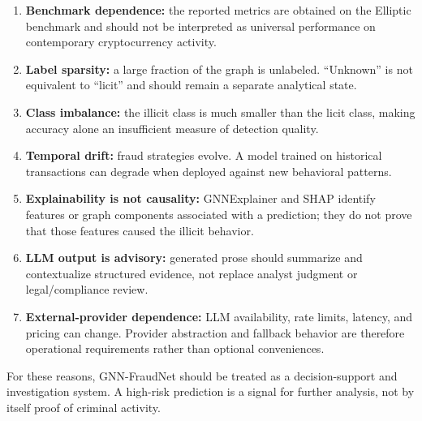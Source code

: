 \documentclass[11pt,a4paper]{report}
\begin{document}
\begin{enumerate}[leftmargin=1.5em]
  \item \textbf{Benchmark dependence:} the reported metrics are obtained on the Elliptic benchmark and should not be interpreted as universal performance on contemporary cryptocurrency activity.
  \item \textbf{Label sparsity:} a large fraction of the graph is unlabeled. ``Unknown'' is not equivalent to ``licit'' and should remain a separate analytical state.
  \item \textbf{Class imbalance:} the illicit class is much smaller than the licit class, making accuracy alone an insufficient measure of detection quality.
  \item \textbf{Temporal drift:} fraud strategies evolve. A model trained on historical transactions can degrade when deployed against new behavioral patterns.
  \item \textbf{Explainability is not causality:} GNNExplainer and SHAP identify features or graph components associated with a prediction; they do not prove that those features caused the illicit behavior.
  \item \textbf{LLM output is advisory:} generated prose should summarize and contextualize structured evidence, not replace analyst judgment or legal/compliance review.
  \item \textbf{External-provider dependence:} LLM availability, rate limits, latency, and pricing can change. Provider abstraction and fallback behavior are therefore operational requirements rather than optional conveniences.
\end{enumerate}

For these reasons, GNN-FraudNet should be treated as a decision-support and investigation system. A high-risk prediction is a signal for further analysis, not by itself proof of criminal activity.
\end{document}
